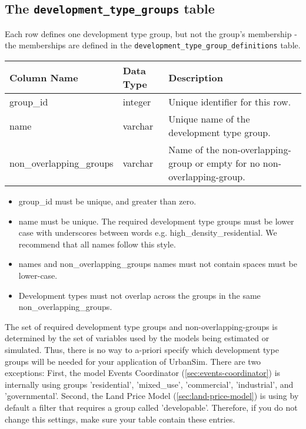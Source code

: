 \subsection{The {\tt development_type_groups} table}
\label{sec:development-tables-type-groups}

Each row defines one development type group, but not the group's
membership - the memberships are defined in the \verb|development_type_group_definitions| table.

\begin{tabular}{lll}

\textbf{Column Name} & \textbf{Data Type} & \textbf{Description} \\

\hline group_id & integer & Unique identifier for this row.  \\

\hline name & varchar & Unique name of the development type group.  \\

\hline non_overlapping_groups & varchar & Name of the non-overlapping-group or
empty for no non-overlapping-group.  \\

\hline
\end{tabular}

\begin{itemize}
\tight
\item group_id must be unique, and greater than zero.
\item name must be unique. The required development type groups must be lower
case with underscores between words e.g. high_density_residential. We recommend
that all names follow this style.
\item names and non_overlapping_groups names must not contain spaces must be lower-case.
\item Development types must not overlap across the groups in the same
non_overlapping_groups.
\end{itemize}

The set of required development type groups and non-overlapping-groups is
determined by the set of variables used by the models being estimated or
simulated.  Thus, there is no way to a-priori specify which development type
groups will be needed for your application of UrbanSim. There are two exceptions:
First, the model Events Coordinator (\ref{sec:events-coordinator}) is internally using groups 'residential', 'mixed_use', 'commercial',
'industrial', and 'governmental'. Second, the Land Price Model (\ref{sec:land-price-model}) is using by default a filter
that requires a group called 'developable'. Therefore, if you do not change this settings, make sure your
table contain these entries.

